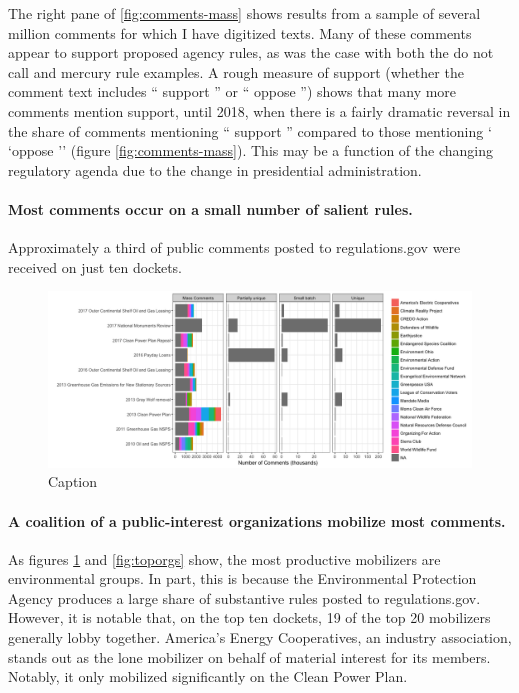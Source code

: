 The right pane of \ref{fig:comments-mass} shows results from a sample of several million comments for which I have digitized texts. Many of these comments appear to support proposed agency rules, as was the case with both the do not call and mercury rule examples. A rough measure of support (whether the comment text includes `` support '' or `` oppose '') shows that many more comments mention support, until 2018, when there is a fairly dramatic reversal in the share of comments mentioning `` support '' compared to those mentioning ` `oppose '' (figure \ref{fig:comments-mass}). This may be a function of the changing regulatory agenda due to the change in presidential administration. 



\paragraph{Most comments occur on a small number of salient rules.} Approximately a third of public comments posted to regulations.gov were received on just ten dockets.


\begin{figure}
    \centering
    \includegraphics{Figs/topdockets}
    \caption{Caption}
    \label{fig:topdockets}
\end{figure}


\paragraph{A coalition of a public-interest organizations mobilize most comments.} As figures \ref{fig:topdockets} and \ref{fig:toporgs} show, the most productive mobilizers are environmental groups. In part, this is because the Environmental Protection Agency produces a large share of substantive rules posted to regulations.gov. However, it is notable that, on the top ten dockets, 19 of the top 20 mobilizers generally lobby together. America's Energy Cooperatives, an industry association, stands out as the lone mobilizer on behalf of material interest for its members. Notably, it only mobilized significantly on the Clean Power Plan. 